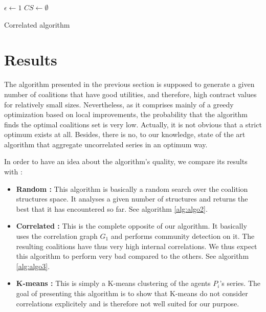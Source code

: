 \documentclass[conference]{IEEEtran}
\begin{document}
\begin{algorithm}
 $ \epsilon \leftarrow 1 $ \;
 $ CS \leftarrow \emptyset $\;
 \caption{Correlated algorithm}
\label{alg:algo3}
\end{algorithm}

\section{Results}

The algorithm presented in the previous section is supposed to generate a given number of coalitions that have good utilities, and therefore, high contract values for relatively small sizes. Nevertheless, as it comprises mainly of a greedy optimization based on local improvements, the probability that the algorithm finds the optimal coalitions set is very low. Actually, it is not obvious that a strict optimum exists at all. Besides, there is no, to our knowledge, state of the art algorithm that aggregate uncorrelated series in an optimum way.

In order to have an idea about the algorithm's quality, we compare its results with :
\begin{itemize}
\item \textbf{Random :} This algorithm is basically a random search over the coalition structures space. It analyses a given number of structures and returns the best that it has encountered so far. See algorithm \ref{alg:algo2}.
\item \textbf{Correlated :} This is the complete opposite of our algorithm. It basically uses the correlation graph $ G_{1} $ and performs community detection on it. The resulting coalitions have thus very high internal correlations. We thus expect this algorithm to perform very bad compared to the others. See algorithm \ref{alg:algo3}.
\item \textbf{K-means :} This is simply a K-means clustering of the agents $ P_{i} $'s series. The goal of presenting this algorithm is to show that K-means do not consider correlations explicitely and is therefore not well suited for our purpose.
\end{itemize} 
\end{document}
